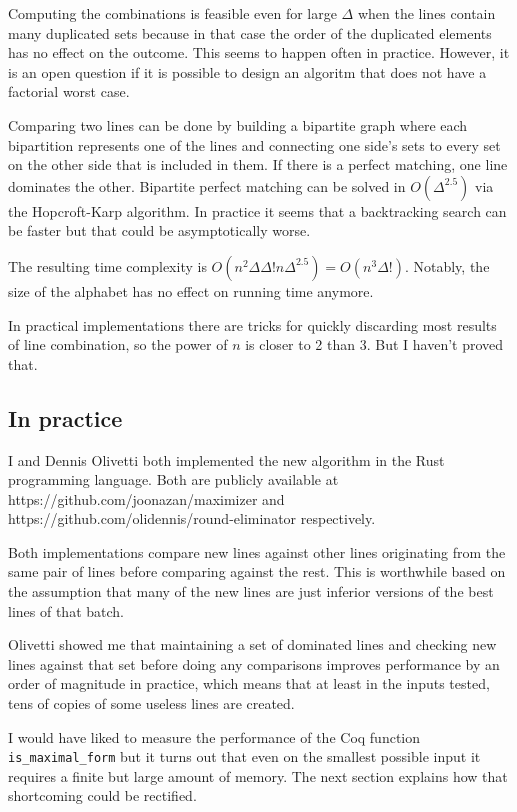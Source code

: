 \documentclass[english, 12pt, a4paper, sci, a-1b, online]{aaltothesis}
\newcommand\icoq[1]{\texttt{#1}}
\begin{document}
Computing the combinations is feasible even for large $\Delta$ when the lines contain many duplicated sets because in that case the order of the duplicated elements has no effect on the outcome. This seems to happen often in practice. However, it is an open question if it is possible to design an algoritm that does not have a factorial worst case.

Comparing two lines can be done by building a bipartite graph where each bipartition represents one of the lines and connecting one side's sets to every set on the other side that is included in them. If there is a perfect matching, one line dominates the other. Bipartite perfect matching can be solved in $O(\Delta^{2.5})$ via the Hopcroft-Karp algorithm. In practice it seems that a backtracking search can be faster but that could be asymptotically worse.

The resulting time complexity is $O(n^2\Delta\Delta!n\Delta^{2.5}) = O(n^3\Delta!)$. Notably, the size of the alphabet has no effect on running time anymore.

In practical implementations there are tricks for quickly discarding most results of line combination, so the power of $n$ is closer to 2 than 3. But I haven't proved that.

\subsection{In practice}

I and Dennis Olivetti both implemented the new algorithm in the Rust programming language. Both are publicly available at https://github.com/joonazan/maximizer and https://github.com/olidennis/round-eliminator respectively.

Both implementations compare new lines against other lines originating from the same pair of lines before comparing against the rest. This is worthwhile based on the assumption that many of the new lines are just inferior versions of the best lines of that batch.

Olivetti showed me that maintaining a set of dominated lines and checking new lines against that set before doing any comparisons improves performance by an order of magnitude in practice, which means that at least in the inputs tested, tens of copies of some useless lines are created.

I would have liked to measure the performance of the Coq function \icoq{is_maximal_form} but it turns out that even on the smallest possible input it requires a finite but large amount of memory. The next section explains how that shortcoming could be rectified.
\end{document}
